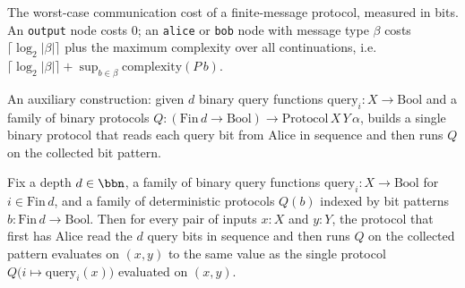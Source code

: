\begin{definition}
\label{CommunicationComplexity.Deterministic.FiniteMessage.Protocol.complexity}
\leanok
{}
The worst-case communication cost of a finite-message protocol, measured in bits.  An
\texttt{output} node costs $0$; an \texttt{alice} or \texttt{bob} node with message type
$\beta$ costs $\lceil \log_2 |\beta| \rceil$ plus the maximum complexity over all continuations,
i.e.\ $\lceil \log_2 |\beta| \rceil + \sup_{b \in \beta} \mathrm{complexity}(P\,b)$.
\end{definition}

\begin{definition}
\label{CommunicationComplexity.Deterministic.FiniteMessage.Protocol.completeTreeAlice}
\leanok
{}
An auxiliary construction: given $d$ binary query functions $\mathrm{query}_i : X \to
\mathrm{Bool}$ and a family of binary protocols $Q : (\mathrm{Fin}\,d \to \mathrm{Bool}) \to
\mathrm{Protocol}\,X\,Y\,\alpha$, builds a single binary protocol that reads each query bit
from Alice in sequence and then runs $Q$ on the collected bit pattern.
\end{definition}

\begin{theorem}
\label{CommunicationComplexity.Deterministic.FiniteMessage.Protocol.completeTreeAlice_run}
\leanok
{}
Fix a depth $d \in \bbn$, a family of binary query functions $\mathrm{query}_i : X \to
\mathrm{Bool}$ for $i \in \mathrm{Fin}\,d$, and a family of deterministic protocols
$Q(b)$ indexed by bit patterns $b : \mathrm{Fin}\,d \to \mathrm{Bool}$. Then for every
pair of inputs $x : X$ and $y : Y$, the protocol that first has Alice read the $d$ query
bits in sequence and then runs $Q$ on the collected pattern evaluates on $(x,y)$ to the
same value as the single protocol $Q\bigl(i \mapsto \mathrm{query}_i(x)\bigr)$ evaluated
on $(x,y)$.
\end{theorem}

